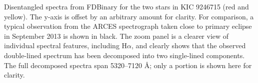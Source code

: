 \label{fig:twospectra} Disentangled spectra from FDBinary for the two stars in KIC 9246715 (red and yellow). The y-axis is offset by an arbitrary amount for clarity. For comparison, a typical observation from the ARCES spectrograph taken close to primary eclipse in September 2013 is shown in black. The zoom panel is a clearer view of individual spectral features, including $\textrm{H}\alpha$, and clearly shows that the observed double-lined spectrum has been decomposed into two single-lined components. The full decomposed spectra span 5320--7120 \AA; only a portion is shown here for clarity.